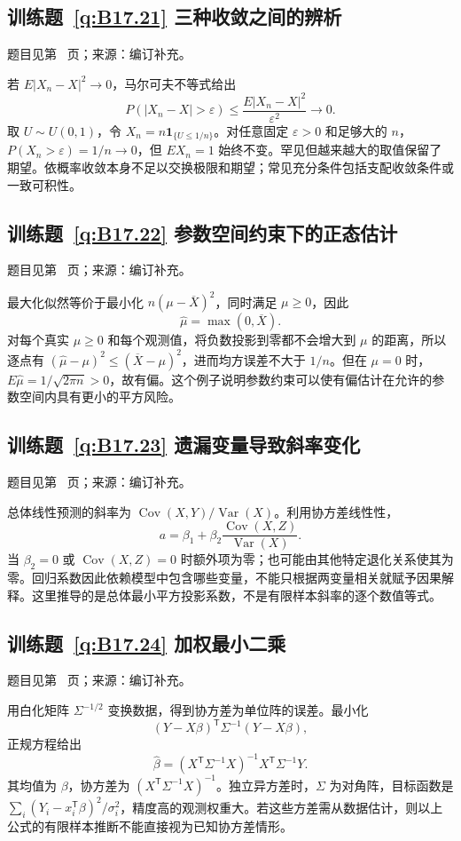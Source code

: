 \documentclass[UTF8,12pt,a4paper,fontset=fandol]{ctexbook}
\begin{document}
\subsection*{训练题~\ref{q:B17.21} 三种收敛之间的辨析}\label{a:B17.21}{\small 题目见第~\pageref{q:B17.21} 页；来源：编订补充。}
\begin{solve}若 $E|X_n-X|^2\to0$，马尔可夫不等式给出\[P(|X_n-X|>\varepsilon)\le\frac{E|X_n-X|^2}{\varepsilon^2}\to0.\]取 $U\sim U(0,1)$，令 $X_n=n\mathbf1_{\{U\le1/n\}}$。对任意固定 $\varepsilon>0$ 和足够大的 $n$，$P(X_n>\varepsilon)=1/n\to0$，但 $EX_n=1$ 始终不变。罕见但越来越大的取值保留了期望。依概率收敛本身不足以交换极限和期望；常见充分条件包括支配收敛条件或一致可积性。\end{solve}

\subsection*{训练题~\ref{q:B17.22} 参数空间约束下的正态估计}\label{a:B17.22}{\small 题目见第~\pageref{q:B17.22} 页；来源：编订补充。}
\begin{solve}最大化似然等价于最小化 $n(\mu-\overline X)^2$，同时满足 $\mu\ge0$，因此\[\widehat\mu=\max(0,\overline X).\]对每个真实 $\mu\ge0$ 和每个观测值，将负数投影到零都不会增大到 $\mu$ 的距离，所以逐点有 $(\widehat\mu-\mu)^2\le(\overline X-\mu)^2$，进而均方误差不大于 $1/n$。但在 $\mu=0$ 时，$E\widehat\mu=1/\sqrt{2\pi n}>0$，故有偏。这个例子说明参数约束可以使有偏估计在允许的参数空间内具有更小的平方风险。\end{solve}

\subsection*{训练题~\ref{q:B17.23} 遗漏变量导致斜率变化}\label{a:B17.23}{\small 题目见第~\pageref{q:B17.23} 页；来源：编订补充。}
\begin{solve}总体线性预测的斜率为 $\operatorname{Cov}(X,Y)/\operatorname{Var}(X)$。利用协方差线性性，\[a=\beta_1+\beta_2\frac{\operatorname{Cov}(X,Z)}{\operatorname{Var}(X)}.\]当 $\beta_2=0$ 或 $\operatorname{Cov}(X,Z)=0$ 时额外项为零；也可能由其他特定退化关系使其为零。回归系数因此依赖模型中包含哪些变量，不能只根据两变量相关就赋予因果解释。这里推导的是总体最小平方投影系数，不是有限样本斜率的逐个数值等式。\end{solve}

\subsection*{训练题~\ref{q:B17.24} 加权最小二乘}\label{a:B17.24}{\small 题目见第~\pageref{q:B17.24} 页；来源：编订补充。}
\begin{solve}用白化矩阵 $\Sigma^{-1/2}$ 变换数据，得到协方差为单位阵的误差。最小化\[(Y-X\beta)^\mathsf T\Sigma^{-1}(Y-X\beta),\]正规方程给出\[\widehat\beta=(X^\mathsf T\Sigma^{-1}X)^{-1}X^\mathsf T\Sigma^{-1}Y.\]其均值为 $\beta$，协方差为 $(X^\mathsf T\Sigma^{-1}X)^{-1}$。独立异方差时，$\Sigma$ 为对角阵，目标函数是 $\sum_i(Y_i-x_i^\mathsf T\beta)^2/\sigma_i^2$，精度高的观测权重大。若这些方差需从数据估计，则以上公式的有限样本推断不能直接视为已知协方差情形。\end{solve}
\end{document}
